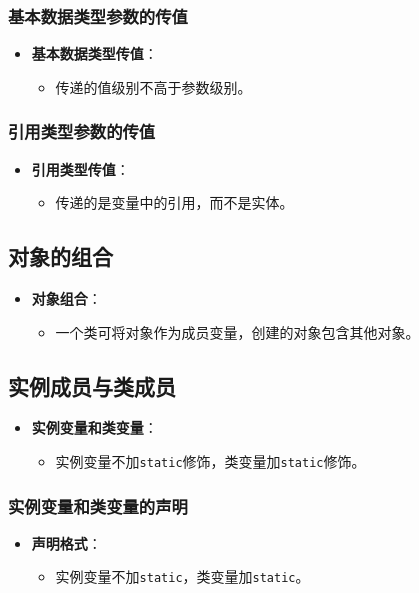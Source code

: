 \documentclass[a4paper, 10pt]{ctexart}
\begin{document}
\subsubsection{基本数据类型参数的传值}
\begin{itemize}
  \item \textbf{基本数据类型传值}：
  \begin{itemize}
    \item 传递的值级别不高于参数级别。
  \end{itemize}
\end{itemize}

\subsubsection{引用类型参数的传值}
\begin{itemize}
  \item \textbf{引用类型传值}：
  \begin{itemize}
    \item 传递的是变量中的引用，而不是实体。
  \end{itemize}
\end{itemize}

\subsection{对象的组合}
\begin{itemize}
  \item \textbf{对象组合}：
  \begin{itemize}
    \item 一个类可将对象作为成员变量，创建的对象包含其他对象。
  \end{itemize}
\end{itemize}

\subsection{实例成员与类成员}
\begin{itemize}
  \item \textbf{实例变量和类变量}：
  \begin{itemize}
    \item 实例变量不加\texttt{static}修饰，类变量加\texttt{static}修饰。
  \end{itemize}
\end{itemize}

\subsubsection{实例变量和类变量的声明}
\begin{itemize}
  \item \textbf{声明格式}：
  \begin{itemize}
    \item 实例变量不加\texttt{static}，类变量加\texttt{static}。
  \end{itemize}
\end{itemize}
\end{document}
